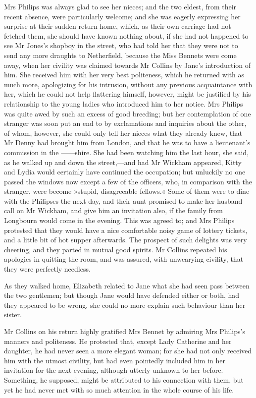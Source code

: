 Mrs Philips was always glad to see her nieces; and the two eldest, from their recent absence, were particularly welcome; and she was eagerly expressing her surprise at their sudden return home, which, as their own carriage had not fetched them, she should have known nothing about, if she had not happened to see Mr Jones's shopboy in the street, who had told her that they were not to send any more draughts to Netherfield, because the Miss Bennets were come away, when her civility was claimed towards Mr Collins by Jane's introduction of him. She received him with her very best politeness, which he returned with as much more, apologizing for his intrusion, without any previous acquaintance with her, which he could not help flattering himself, however, might be justified by his relationship to the young ladies who introduced him to her notice. Mrs Philips was quite awed by such an excess of good breeding; but her contemplation of one stranger was soon put an end to by exclamations and inquiries about the other, of whom, however, she could only tell her nieces what they already knew, that Mr Denny had brought him from London, and that he was to have a lieutenant's commission in the ——shire. She had been watching him the last hour, she said, as he walked up and down the street,—and had Mr Wickham appeared, Kitty and Lydia would certainly have continued the occupation; but unluckily no one passed the windows now except a few of the officers, who, in comparison with the stranger, were become »stupid, disagreeable fellows.« Some of them were to dine with the Philipses the next day, and their aunt promised to make her husband call on Mr Wickham, and give him an invitation also, if the family from Longbourn would come in the evening. This was agreed to; and Mrs Philips protested that they would have a nice comfortable noisy game of lottery tickets, and a little bit of hot supper afterwards. The prospect of such delights was very cheering, and they parted in mutual good spirits. Mr Collins repeated his apologies in quitting the room, and was assured, with unwearying civility, that they were perfectly needless.

As they walked home, Elizabeth related to Jane what she had seen pass between the two gentlemen; but though Jane would have defended either or both, had they appeared to be wrong, she could no more explain such behaviour than her sister.

Mr Collins on his return highly gratified Mrs Bennet by admiring Mrs Philips's manners and politeness. He protested that, except Lady Catherine and her daughter, he had never seen a more elegant woman; for she had not only received him with the utmost civility, but had even pointedly included him in her invitation for the next evening, although utterly unknown to her before. Something, he supposed, might be attributed to his connection with them, but yet he had never met with so much attention in the whole course of his life.